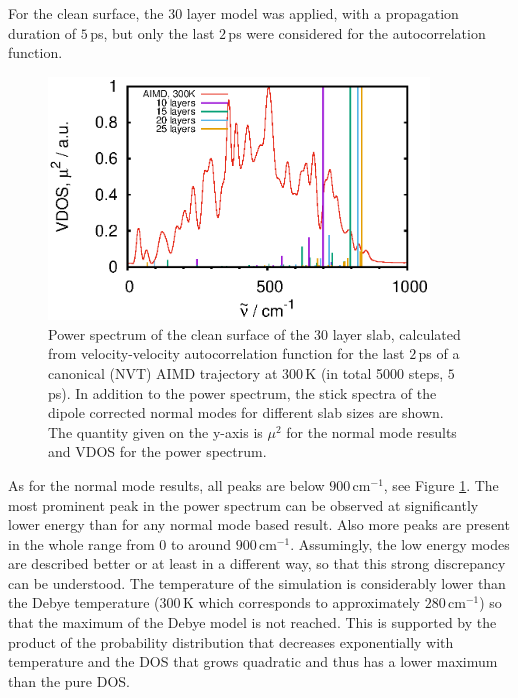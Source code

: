 \documentclass[11pt,DIV=13,BCOR=5mm,a4paper,headinclude]{scrbook}
\begin{document}
For the clean surface, the 30 layer model was applied, with a propagation duration of $5\,$ps, but only the last $2\,$ps were considered for the autocorrelation function.
\begin{figure}[!h]
    \centering
    \includegraphics[width=0.9\textwidth]{figures/11-20/comp_cleansurf_all.eps}%
             \caption{Power spectrum of the clean surface of the 30 layer slab, calculated from velocity-velocity autocorrelation function for the last $2\,$ps of a canonical (NVT) AIMD trajectory at $300\,$K (in total 5000 steps, $5\,$ps).
In addition to the power spectrum, the stick spectra of the dipole corrected normal modes for different slab sizes are shown.
The quantity given on the y-axis is $\mu^2$ for the normal mode results and VDOS for the power spectrum.} \label{abb:velvelclean}
\end{figure}
As for the normal mode results, all peaks are below $900\,$cm$^{-1}$, see Figure \ref{abb:velvelclean}.
The most prominent peak in the power spectrum can be observed at significantly lower energy than for any normal mode based result.
Also more peaks are present in the whole range from $0$ to around $900\,$cm$^{-1}$.
Assumingly, the low energy modes are described better or at least in a different way, so that this strong discrepancy can be understood.
The temperature of the simulation is considerably lower than the Debye temperature ($300\,$K which corresponds to approximately $280\,$cm$^{-1}$) so that the maximum of the Debye model is not reached.
This is supported by the product of the probability distribution that decreases exponentially with temperature and the DOS that grows quadratic and thus has a lower maximum than the pure DOS.
\\\\
\end{document}
